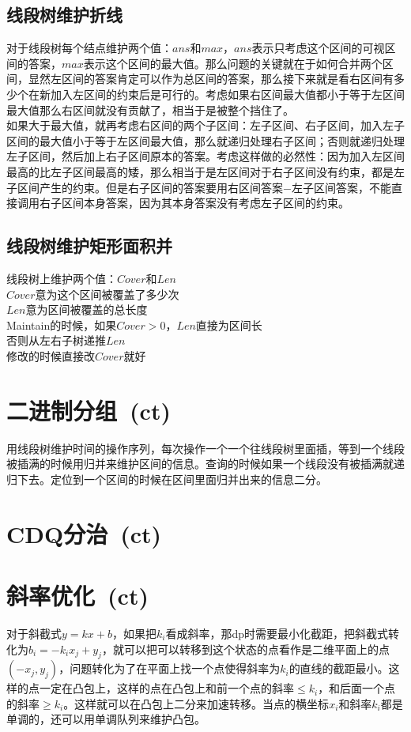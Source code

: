 	\subsection*{线段树维护折线}
		对于线段树每个结点维护两个值：$ ans $和$ max $，$ ans $表示只考虑这个区间的可视区间的答案，$ max $表示这个区间的最大值。那么问题的关键就在于如何合并两个区间，显然左区间的答案肯定可以作为总区间的答案，那么接下来就是看右区间有多少个在新加入左区间的约束后是可行的。考虑如果右区间最大值都小于等于左区间最大值那么右区间就没有贡献了，相当于是被整个挡住了。
		\\如果大于最大值，就再考虑右区间的两个子区间：左子区间、右子区间，加入左子区间的最大值小于等于左区间最大值，那么就递归处理右子区间；否则就递归处理左子区间，然后加上右子区间原本的答案。考虑这样做的必然性：因为加入左区间最高的比左子区间最高的矮，那么相当于是左区间对于右子区间没有约束，都是左子区间产生的约束。但是右子区间的答案要用右区间答案$ - $左子区间答案，不能直接调用右子区间本身答案，因为其本身答案没有考虑左子区间的约束。
	\subsection*{线段树维护矩形面积并}
		线段树上维护两个值：$ Cover $和$ Len $
		\\$ Cover $意为这个区间被覆盖了多少次
		\\$ Len $意为区间被覆盖的总长度
		\\Maintain的时候，如果$ Cover > 0 $，$ Len $直接为区间长
		\\否则从左右子树递推$ Len $
		\\修改的时候直接改$ Cover $就好
\section{二进制分组\ \small(ct)}
	用线段树维护时间的操作序列，每次操作一个一个往线段树里面插，等到一个线段被插满的时候用归并来维护区间的信息。查询的时候如果一个线段没有被插满就递归下去。定位到一个区间的时候在区间里面归并出来的信息二分。
\section{CDQ分治\ \small(ct)}
\section{斜率优化\ \small(ct)}
	对于斜截式$ y = k x + b $，如果把$ k_i $看成斜率，那dp时需要最小化截距，把斜截式转化为$ b_i = - k_i x_j + y_j $，就可以把可以转移到这个状态的点看作是二维平面上的点$ (- x_j, y_j) $，问题转化为了在平面上找一个点使得斜率为$ k_i $的直线的截距最小。这样的点一定在凸包上，这样的点在凸包上和前一个点的斜率$ \leq k_i$，和后面一个点的斜率$ \geq k_i $。这样就可以在凸包上二分来加速转移。当点的横坐标$ x_i $和斜率$ k_i $都是单调的，还可以用单调队列来维护凸包。
